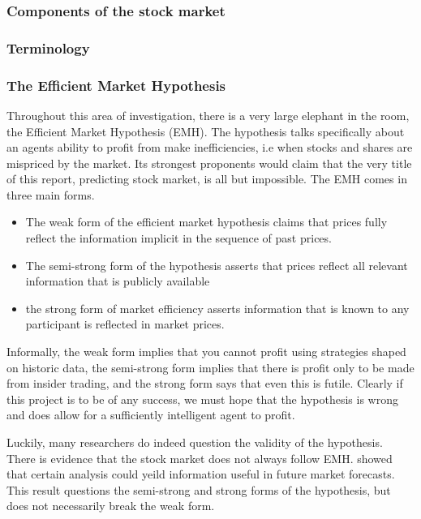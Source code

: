 \documentclass[a4paper,11pt]{article}
\begin{document}
\subsubsection{Components of the stock market}
\subsubsection{Terminology}
\subsubsection{The Efficient Market Hypothesis}

Throughout this area of investigation, there is a very large elephant in the room, the Efficient Market Hypothesis (EMH). The hypothesis talks specifically about an agents ability to profit from make inefficiencies, i.e when stocks and shares are mispriced by the market. Its strongest proponents would claim that the very title of this report, predicting stock market, is all but impossible. The EMH comes in three main forms.
\begin{itemize}
  \item The weak form of the efficient market hypothesis claims that prices fully
reflect the information implicit in the sequence of past prices. 

  \item The semi-strong form of the hypothesis asserts that prices reflect all relevant information that is publicly available
  
  \item the strong form of market efficiency asserts information that is known to any participant is reflected in market prices.
\end{itemize}
\cite{dimson1998brief}

Informally, the weak form implies that you cannot profit using strategies shaped on historic data, the semi-strong form implies that there is profit only to be made from insider trading, and the strong form says that even this is futile. Clearly if this project is to be of any success, we must hope that the hypothesis is wrong and does allow for a sufficiently intelligent agent to profit.

Luckily, many researchers do indeed question the validity of the hypothesis. There is evidence that the stock market does not always follow EMH. \citet{basu1983relationship} showed that certain analysis could yeild information useful in future market forecasts. This result questions the semi-strong and strong forms of the hypothesis, but does not necessarily break the weak form.
\end{document}
